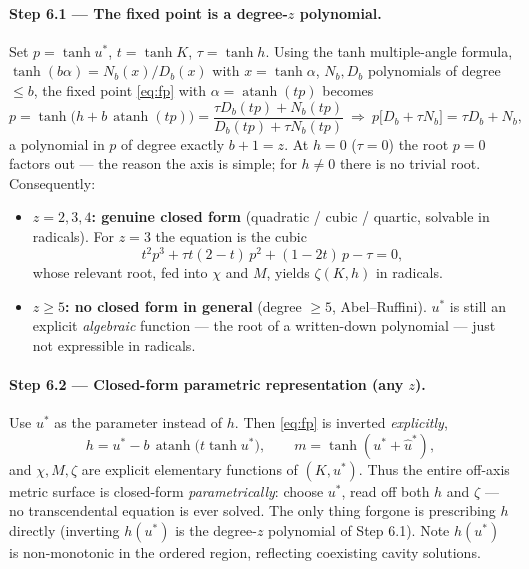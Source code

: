 \documentclass[11pt]{article}
\newcommand{\atanh}{\operatorname{atanh}}
\begin{document}
\paragraph{Step 6.1 --- The fixed point is a degree-$z$ polynomial.}
Set $p=\tanh u^*$, $t=\tanh K$, $\tau=\tanh h$. Using the tanh multiple-angle formula,
$\tanh(b\alpha)=N_b(x)/D_b(x)$ with $x=\tanh\alpha$, $N_b,D_b$ polynomials of degree $\le b$, the
fixed point \eqref{eq:fp} with $\alpha=\atanh(tp)$ becomes
\begin{equation}
p=\tanh\!\big(h+b\,\atanh(tp)\big)=\frac{\tau D_b(tp)+N_b(tp)}{D_b(tp)+\tau N_b(tp)}
\ \Longrightarrow\
p\big[D_b+\tau N_b\big]=\tau D_b+N_b,
\end{equation}
a polynomial in $p$ of degree exactly $b+1=z$. At $h=0$ ($\tau=0$) the root $p=0$ factors out --- the
reason the axis is simple; for $h\ne0$ there is no trivial root. Consequently:
\begin{itemize}[topsep=2pt,itemsep=1pt]
\item \textbf{$z=2,3,4$: genuine closed form} (quadratic / cubic / quartic, solvable in radicals).
For $z=3$ the equation is the cubic
\begin{equation}
t^2p^3+\tau t(2-t)\,p^2+(1-2t)\,p-\tau=0,
\end{equation}
whose relevant root, fed into $\chi$ and $M$, yields $\zeta(K,h)$ in radicals.
\item \textbf{$z\ge5$: no closed form in general} (degree $\ge5$, Abel--Ruffini). $u^*$ is still an
explicit \emph{algebraic} function --- the root of a written-down polynomial --- just not expressible
in radicals.
\end{itemize}

\paragraph{Step 6.2 --- Closed-form parametric representation (any $z$).}
Use $u^*$ as the parameter instead of $h$. Then \eqref{eq:fp} is inverted \emph{explicitly},
\begin{equation}
\boxed{\;h=u^*-b\,\atanh\!\big(t\tanh u^*\big),\qquad m=\tanh(u^*+\hat u^*),\;}
\end{equation}
and $\chi,M,\zeta$ are explicit elementary functions of $(K,u^*)$. Thus the entire off-axis metric
surface is closed-form \emph{parametrically}: choose $u^*$, read off both $h$ and $\zeta$ --- no
transcendental equation is ever solved. The only thing forgone is prescribing $h$ directly (inverting
$h(u^*)$ is the degree-$z$ polynomial of Step 6.1). Note $h(u^*)$ is non-monotonic in the ordered
region, reflecting coexisting cavity solutions.
\end{document}
